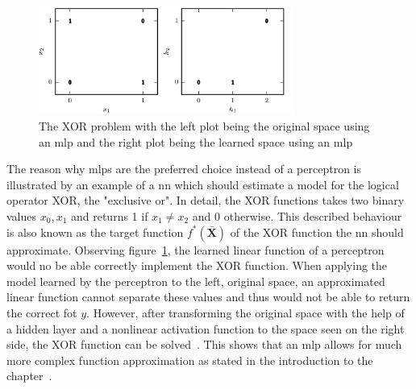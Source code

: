 \documentclass[draft,final]{vutinfth} %
\newcommand{\p}[1]{see p. #1}
\begin{document}
    \begin{figure}[h]
        \centering
        \includegraphics[width=0.75\textwidth]{figures/xor_problem.png}
        \caption[The XOR problem with the left plot being the original space using an \gls{mlp} and the right plot being the learned space using an \gls{mlp}]{The XOR problem with the left plot being the original space using an \gls{mlp} and the right plot being the learned space using an \gls{mlp}\protect\footnotemark}
        \label{fig:xor_problem}
    \end{figure}

    \footnotetext{\cite[\p{168}]{goodfellow_deep_2016}}
    The reason why \gls{mlp}s are the preferred choice instead of a perceptron is illustrated by an example of a \gls{nn} which should estimate a model for the logical operator XOR, the "exclusive or".
    In detail, the XOR functions takes two binary values $x_0,x_1$ and returns 1 if $x_1 \neq x_2$ and 0 otherwise.
    This described behaviour is also known as the target function $f^*(\bar{\mathbf{X}})$ of the XOR function the \gls{nn} should approximate.
    Observing figure~\ref{fig:xor_problem}, the learned linear function of a perceptron would no be able correctly implement the XOR function.
    When applying the model learned by the perceptron to the left, original space, an approximated linear function cannot separate these values and thus would not be able to return the correct fot $y$.
    However, after transforming the original space with the help of a hidden layer and a nonlinear activation function to the space seen on the right side, the XOR function can be solved~\citep{goodfellow_deep_2016}.
    This shows that an \gls{mlp} allows for much more complex function approximation as stated in the introduction to the chapter~.

\end{document}
